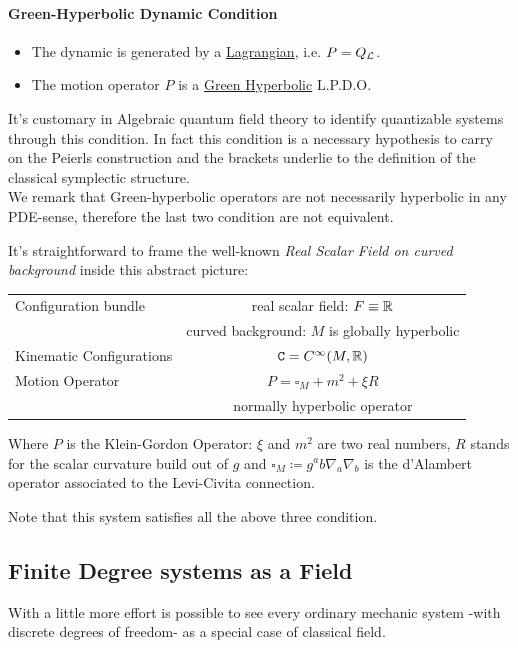 \documentclass[Main]{subfiles}
\begin{document}
		\paragraph{Green-Hyperbolic Dynamic Condition}
		\begin{itemize}
			\item The dynamic is generated by a \underline{Lagrangian}, i.e.  $P= Q_{\mathcal{L}}$.
			\item The motion operator $P$ is a \underline{Green Hyperbolic} L.P.D.O.
		\end{itemize}
		It's customary in Algebraic quantum field theory to identify quantizable systems through this condition.
		In fact this condition is a necessary hypothesis to carry on the Peierls construction and the brackets underlie to the definition of the classical symplectic structure.
		\\
		We remark that Green-hyperbolic operators are not necessarily hyperbolic in any PDE-sense, therefore the last two condition are not equivalent.
			 
		\begin{example}
		It's straightforward  to frame the well-known \emph{Real Scalar Field on curved background} inside this abstract picture:
			\begin{center}\begin{tabular}{|l|c|}
			\hline
			Configuration bundle & real scalar field: $F \equiv \mathbb{R}$\\
													& curved background: $M$ is globally hyperbolic\\
			\hline
			Kinematic Configurations & $\mathtt{C} = C^\infty(M,\mathbb{R})$\\
			\hline
			Motion Operator			&  $P=\square_M + m^2 + \xi R$ \\
													& normally hyperbolic operator\\
			\hline
			\end{tabular}\end{center}
			Where $P$ is the Klein-Gordon Operator: $\xi$ and $m^2$ are two real numbers, $R$ stands for the scalar curvature build out of $g$ and $\square_M \coloneqq g^ab \nabla_a \nabla_b$ is the d'Alambert operator associated to the Levi-Civita connection.	
			
		Note that this system satisfies all the above three condition.
		\end{example}
	



		\subsection{Finite Degree systems as a Field}\label{MechanicsAsAField}
			With a little more effort is possible to see every ordinary mechanic system  -with discrete degrees of freedom- as a special case of classical field.
			
\end{document}
